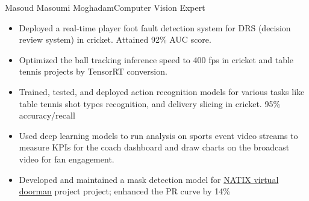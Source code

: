 \documentclass{article}
\begin{document}
\graphicspath{ {./images/} }

\begin{cv}[avatar]{Masoud Masoumi Moghadam}{Computer Vision Expert}





\begin{cvevent}[03/2021][present]
    \begin{itemize}
        \item Deployed a real-time player foot fault detection system for DRS (decision review system) in cricket. Attained 92\% AUC score.\vspace{7pt}
        
        \item Optimized the ball tracking inference speed to 400 fps in cricket and table tennis projects by TensorRT conversion.\vspace{7pt}
        
        \item Trained, tested, and deployed action recognition models for various tasks like table tennis shot types recognition, and delivery slicing in cricket. 95\% accuracy/recall \vspace{7pt}
        
        \item Used deep learning models to run analysis on sports event video streams to measure KPIs for the coach dashboard and draw charts on the broadcast video for fan engagement. \vspace{7pt}
    \end{itemize}
\end{cvevent}

\begin{cvevent}[10/2020][03/2021]
    \begin{itemize}
        \item  Developed and maintained a mask detection model for \href{https://medium.com/natix-io/introducing-natix-virtual-doorman-af378e2c3803}{NATIX virtual doorman} project project; enhanced the PR curve by 14\% \vspace{7pt}
        

\end{itemize}
\end{cvevent}
\end{cv}
\end{document}
